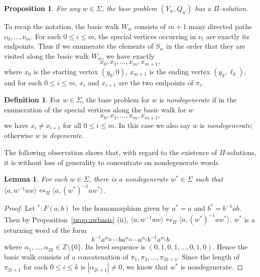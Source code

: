 \documentclass[10pt,a4paper]{amsart}
\newtheorem{proposition}[theorem]{Proposition}
\newtheorem{lemma}[theorem]{Lemma}
\theoremstyle{definition}
\newtheorem{definition}[theorem]{Definition}
\theoremstyle{definition}
\numberwithin{equation}{section}
\begin{document}
\begin{proposition} For any $w\in \Sigma$, the base problem $(Y_w, Q_w)$ has a $\Pi$-solution.
\end{proposition}

To recap the notation, the basic walk $W_w$ consists of $m+1$ many directed paths $\nu_0,\dots, \nu_{m}$. For each $0\leq i\leq m$, the special vertices occurring in $\nu_i$ are exactly its endpoints. Thus if we enumerate the elements of $S_w$ in the order that they are visited along the basic walk $W_w$, we have exactly
$$ x_0, x_1, \dots, x_m, x_{m+1}, $$
where $x_0$ is the starting vertex $(y_0,0)$, $x_{m+1}$ is the ending vertex $(y_k,\ell_k)$, and for each $0\leq i\leq m$, $x_{i}$ and $x_{i+1}$ are the two endpoints of $\pi_i$. 


\begin{definition} For $w\in \Sigma$, the base problem for $w$ is {\em nondegenerate} if in the enumeration of the special vertices along the basic walk for $w$
$$ x_0, x_1, \dots, x_m, x_{m+1}, $$
we have $x_i\neq x_{i+1}$ for all $0\leq i\leq m$. In this case we also say $w$ is {\em nondegenerate}; otherwise $w$ is {\em degenerate}.
\end{definition}

The following observation shows that, with regard to the existence of $\Pi$-solutions, it is without loss of generality to concentrate on nondegenerate words.

\begin{lemma} For each $w\in \Sigma$, there is a nondegenerate $w^*\in \Sigma$ such that $\langle a, w^{-1}aw\rangle\leftrightsquigarrow_\Pi\big\langle a, (w^*)^{-1}aw^*\big\rangle$.
\end{lemma}

\begin{proof} Let ${}^*\colon F(a,b)$ be the homomorphism given by $a^*=a$ and $b^*=b^{-1}ab$. Then by Proposition~\ref{prop:awbasic} (ii), $\langle a, w^{-1}aw\rangle\leftrightsquigarrow_\Pi\big\langle a, (w^*)^{-1}aw^*\big\rangle$. $w^*$ is a returning word of the form
$$ b^{-1}a^{\alpha_{2k+1}}ba^{\alpha_{2k}}\cdots a^{\alpha_2}b^{-1}a^{\alpha_1}b $$
where $\alpha_1, \dots, \alpha_{2k}\in \mathbb{Z}\setminus\{0\}$. 
Its level sequence is $(0,1,0,1,\dots, 0,1,0)$. Hence the basic walk consists of a concatenation of $\pi_1, \pi_3, \dots, \pi_{2k+1}$. Since the length of $\pi_{2i+1}$ for each $0\leq i\leq k$ is $|\alpha_{2i+1}|\neq 0$, we know that $w^*$ is nondegenerate.
\end{proof}
\end{document}
